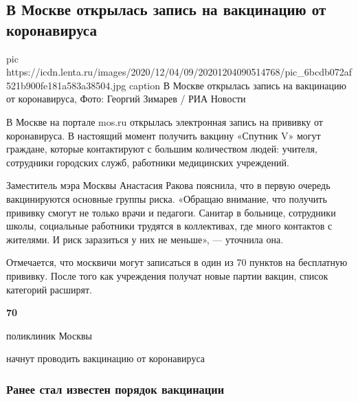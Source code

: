  
 
 
 
 
 
\subsection{В Москве открылась запись на вакцинацию от коронавируса}
\label{sec:04_12_2020.news.ru.lenta_ru.1.koronavirus_moskva_vaccine}


\ifcmt
pic https://icdn.lenta.ru/images/2020/12/04/09/20201204090514768/pic_6bcdb072af521b900fe181a583a38504.jpg
caption В Москве открылась запись на вакцинацию от коронавируса, Фото: Георгий Зимарев / РИА Новости
\fi

В Москве на портале mos.ru открылась электронная запись на прививку от
коронавируса. В настоящий момент получить вакцину «Спутник V» могут граждане,
которые контактируют с большим количеством людей: учителя, сотрудники городских
служб, работники медицинских учреждений.

Заместитель мэра Москвы Анастасия Ракова пояснила, что в первую очередь
вакцинируются основные группы риска. «Обращаю внимание, что получить прививку
смогут не только врачи и педагоги. Санитар в больнице, сотрудники школы,
социальные работники трудятся в коллективах, где много контактов с жителями. И
риск заразиться у них не меньше», — уточнила она.

Отмечается, что москвичи могут записаться в один из 70 пунктов на бесплатную
прививку. После того как учреждения получат новые партии вакцин, список
категорий расширят.

\begin{leftbar}
	\bfseries
{\centering\Huge\color{orange}	70}\par
поликлиник Москвы\par
начнут проводить вакцинацию от коронавируса
\end{leftbar}

\subsubsection{Ранее стал известен порядок вакцинации}


